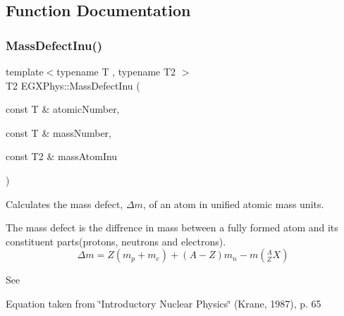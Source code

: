 \subsection{Function Documentation}
\mbox{\label{group___mass_defect_ga70400004a5cb622de372ab84670731ef}} 
\subsubsection{\texorpdfstring{Mass\+Defect\+Inu()}{MassDefectInu()}}
{\footnotesize\ttfamily template$<$typename T , typename T2 $>$ \\
T2 E\+G\+X\+Phys\+::\+Mass\+Defect\+Inu (\begin{DoxyParamCaption}\item[{const T \&}]{atomic\+Number,  }\item[{const T \&}]{mass\+Number,  }\item[{const T2 \&}]{mass\+Atom\+Inu }\end{DoxyParamCaption})}



Calculates the mass defect, $\Delta m$, of an atom in unified atomic mass units. 

The mass defect is the diffrence in mass between a fully formed atom and its constituent parts(protons, neutrons and electrons). \[\Delta m = Z(m_p + m_e)+(A-Z)m_n - m({^A_ZX})\]

See

Equation taken from \char`\"{}\+Introductory Nuclear Physics\char`\"{} (Krane, 1987), p. 65


